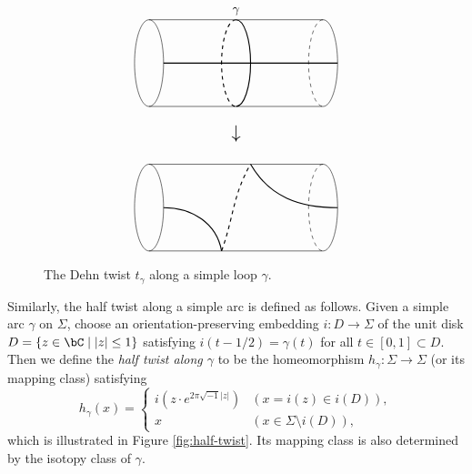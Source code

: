 \documentclass{amsart}
\numberwithin{equation}{section}
\theoremstyle{plain}
\theoremstyle{definition}
\begin{document}
\begin{figure}[h]
    \centering
    \begin{displaymath}
        \begin{tikzpicture}[scale=0.8]
            \draw (0,0+5)--(6,0+5);
            \draw (0,3+5)--(6,3+5);

            \draw[thick] (0.5, 1.5+5)--(6.5, 1.5+5);

            \draw (0, 1.5+5) circle[x radius=0.5, y radius=1.5];

            \draw(6, 0+5)arc(-90:90:0.5 and 1.5);
            \draw[dashed](6, 3+5)arc(90:270:0.5 and 1.5);

            \draw[thick](3, 0+5)arc(-90:90:0.5 and 1.5);
            \draw[thick, dashed](3, 3+5)arc(90:270:0.5 and 1.5);


            \draw(3, 3+5) node[above]{$\gamma$};

            \draw(3, -0.5+5) node[below]{\Large$\downarrow$};


            \draw (0,0)--(6,0);
            \draw (0,3)--(6,3);

            \draw (0, 1.5) circle[x radius=0.5, y radius=1.5];

            \draw(6, 0)arc(-90:90:0.5 and 1.5);
            \draw[dashed](6, 3)arc(90:270:0.5 and 1.5);

            \draw[thick](0.5, 1.5) to[out=0,in=100](2.5, 0);
            \draw[thick, dashed](2.5, 0) to[out=70,in=-120](3.5, 3);
            \draw[thick](3.5, 3) to[out=-60,in=180](6.5, 1.5);
        \end{tikzpicture}
    \end{displaymath}
    \caption{The Dehn twist $t_\gamma$ along a simple loop $\gamma$.}
    \label{fig:Dehn-twist}
\end{figure}


Similarly, the half twist along a simple arc is defined as follows. Given a simple arc $\gamma$ on $\Sigma$, choose an orientation-preserving embedding $i \colon D \to \Sigma$ of the unit disk $D = \{z \in \bC \mid |z| \leq 1\}$ satisfying $i(t - 1/2) = \gamma(t)$ for all $t \in [0, 1] \subset D$.
Then we define the \emph{half twist along $\gamma$} to be the homeomorphism $h_\gamma \colon \Sigma \to \Sigma$ (or its mapping class) satisfying
\begin{equation}
    h_\gamma(x) = \begin{cases}
        i(z \cdot e^{2\pi \sqrt{-1} |z|}) & (x = i(z) \in i(D)),           \\
        x                                 & (x \in \Sigma \setminus i(D)),
    \end{cases}
\end{equation}
which is illustrated in Figure \ref{fig:half-twist}.
Its mapping class is also determined by the isotopy class of $\gamma$.
\end{document}
